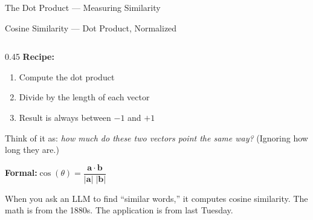 \begin{frame}{The Dot Product --- Measuring Similarity}
\end{frame}

\begin{frame}[shrink=19]{Cosine Similarity --- Dot Product, Normalized}

  \begin{columns}[T]
    \begin{column}{0.45\textwidth}
      \textbf{Recipe:}
      \begin{enumerate}
        \item Compute the dot product
        \item Divide by the length of each vector
        \item Result is always between $-1$ and $+1$
      \end{enumerate}

      \vspace{0.3em}
      Think of it as: \emph{how much do these two vectors point the same way?}
      (Ignoring how long they are.)

      \vspace{0.5em}
      {\footnotesize\colorbox{digitalBlue!8}{\parbox{0.9\linewidth}{%
        \textbf{Formal:}\quad $\cos(\theta) = \dfrac{\mathbf{a} \cdot \mathbf{b}}%
        {\lvert\mathbf{a}\rvert \;\lvert\mathbf{b}\rvert}$}}}

      \vspace{0.5em}
      \begin{insightbox}
        When you ask an LLM to find ``similar words,'' it computes cosine similarity.
        The math is from the 1880s. The application is from last Tuesday.
      \end{insightbox}
    \end{column}


\end{columns}
\end{frame}
